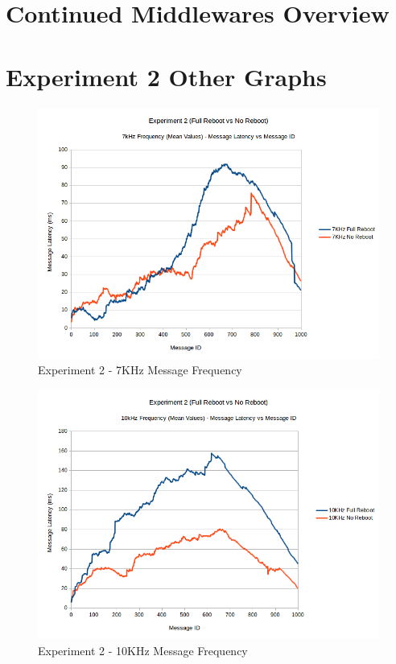 \documentclass{l4proj}
\begin{document}
\begin{appendices}

\chapter{Continued Middlewares Overview}
\label{middlewares-overview-appendix}


\chapter{Experiment 2 Other Graphs}
\label{exp2-appendix-results}

\begin{figure}
\centering
\includegraphics[width=\textwidth]{images/experiment2/7khz-mean.png}
\caption{Experiment 2 - 7KHz Message Frequency}
\label{exp2-7khz}
\end{figure}

\begin{figure}
\centering
\includegraphics[width=\textwidth]{images/experiment2/10khz-mean.png}
\caption{Experiment 2 - 10KHz Message Frequency}
\label{exp2-10khz}
\end{figure}

\end{appendices}




\end{document}
